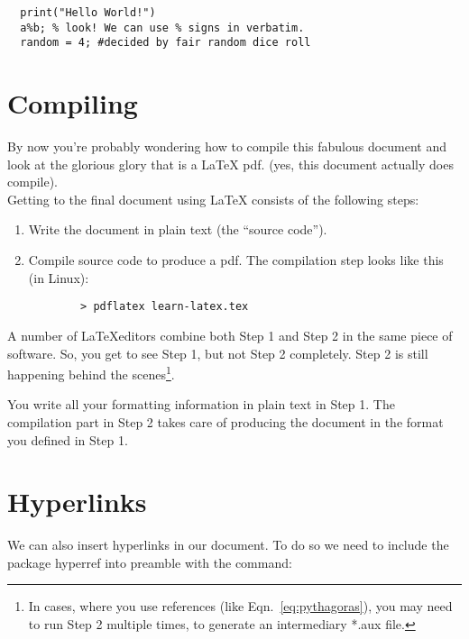 \documentclass[12pt]{article}
\begin{document}
\begin{verbatim} 
  print("Hello World!")
  a%b; % look! We can use % signs in verbatim. 
  random = 4; #decided by fair random dice roll
\end{verbatim}

\section{Compiling} 

By now you're probably wondering how to compile this fabulous document 
and look at the glorious glory that is a \LaTeX \hspace{1pt} pdf.
(yes, this document actually does compile). \\
Getting to the final document using \LaTeX \hspace{1pt} consists of the following 
steps:
  \begin{enumerate}
    \item Write the document in plain text (the ``source code'').
    \item Compile source code to produce a pdf. 
     The compilation step looks like this (in Linux): \\
     \begin{verbatim} 
        > pdflatex learn-latex.tex
     \end{verbatim}
  \end{enumerate}

A number of \LaTeX \hspace{1pt}editors combine both Step 1 and Step 2 in the 
same piece of software. So, you get to see Step 1, but not Step 2 completely.
Step 2 is still happening behind the scenes\footnote{In cases, where you use
references (like Eqn.~\ref{eq:pythagoras}), you may need to run Step 2
multiple times, to generate an intermediary *.aux file.}.

You write all your formatting information in plain text in Step 1.
The compilation part in Step 2 takes care of producing the document in the
format you defined in Step 1.

\section{Hyperlinks}
We can also insert hyperlinks in our document. To do so we need to include the
package hyperref into preamble with the command:
\end{document}
